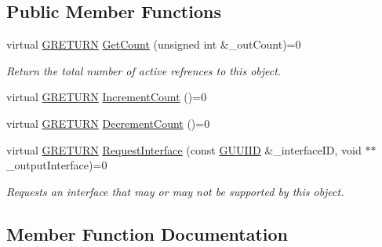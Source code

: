 \subsection*{Public Member Functions}
\begin{DoxyCompactItemize}
\item 
\hypertarget{class_g_w_1_1_c_o_r_e_1_1_g_interface_a80f212dcdf60202cf9da49405863d1d5}{}\label{class_g_w_1_1_c_o_r_e_1_1_g_interface_a80f212dcdf60202cf9da49405863d1d5} 
virtual \hyperlink{namespace_g_w_a69b1aaebac1cac8049825f035884c95b}{G\+R\+E\+T\+U\+RN} \hyperlink{class_g_w_1_1_c_o_r_e_1_1_g_interface_a80f212dcdf60202cf9da49405863d1d5}{Get\+Count} (unsigned int \&\+\_\+out\+Count)=0
\begin{DoxyCompactList}\small\item\em Return the total number of active refrences to this object. \end{DoxyCompactList}\item 
virtual \hyperlink{namespace_g_w_a69b1aaebac1cac8049825f035884c95b}{G\+R\+E\+T\+U\+RN} \hyperlink{class_g_w_1_1_c_o_r_e_1_1_g_interface_a3e04e58eef4f3e3f56ff7fb751194c37}{Increment\+Count} ()=0
\item 
virtual \hyperlink{namespace_g_w_a69b1aaebac1cac8049825f035884c95b}{G\+R\+E\+T\+U\+RN} \hyperlink{class_g_w_1_1_c_o_r_e_1_1_g_interface_af6924e12b14f217b518fc91c63d9703d}{Decrement\+Count} ()=0
\item 
\hypertarget{class_g_w_1_1_c_o_r_e_1_1_g_interface_ab1414aa07bca310a824ee01a91657ad0}{}\label{class_g_w_1_1_c_o_r_e_1_1_g_interface_ab1414aa07bca310a824ee01a91657ad0} 
virtual \hyperlink{namespace_g_w_a69b1aaebac1cac8049825f035884c95b}{G\+R\+E\+T\+U\+RN} \hyperlink{class_g_w_1_1_c_o_r_e_1_1_g_interface_ab1414aa07bca310a824ee01a91657ad0}{Request\+Interface} (const \hyperlink{struct_g_w_1_1_g_u_u_i_i_d}{G\+U\+U\+I\+ID} \&\+\_\+interface\+ID, void $\ast$$\ast$\+\_\+output\+Interface)=0
\begin{DoxyCompactList}\small\item\em Requests an interface that may or may not be supported by this object. \end{DoxyCompactList}\end{DoxyCompactItemize}


\subsection{Member Function Documentation}
\hypertarget{class_g_w_1_1_c_o_r_e_1_1_g_interface_af6924e12b14f217b518fc91c63d9703d}{}\label{class_g_w_1_1_c_o_r_e_1_1_g_interface_af6924e12b14f217b518fc91c63d9703d} 
